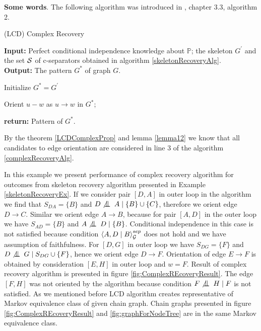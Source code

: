 %
%

\textbf{Some words}. The following algorithm was introduced in \cite{CG}, chapter 3.3, algorithm 2.

\begin{algorithm}
	\caption{(LCD) Complex Recovery}\label{complexRecoveryAlg}
	
	\textbf{Input:} Perfect conditional independence knowledge about $\mathbb{P}$; the skeleton $G^{'}$ and the set 
					$\mathcal{S}$ of c-separators obtained in algorithm \ref{skeletonRecoveryAlg}.  \\
	\textbf{Output:} The pattern $G^{*}$ of graph $G$.

	
	\begin{algorithmic}[1]
			\State Initialize $G^{*} = G^{'}$ 
	
						\State Orient $u - w$ as $u \rightarrow w$ in $G^{*}$;
					\EndIf
				\EndFor
			\EndFor			
			
			\State \textbf{return:} Pattern of $G^{*}$.
		\EndProcedure
	\end{algorithmic}
\end{algorithm}

By the theorem \ref{LCDComplexProp} and lemma \ref{lemma12} we know that all candidates to edge orientation
are considered in line 3 of the algorithm \ref{complexRecoveryAlg}. 


\begin{ex}
	In this example we present performance of complex recovery algorithm for outcomes from skeleton recovery
	algorithm presented in Example \ref{skeletonRecoveryEx}. If we consider pair $[D, A]$ in outer loop in
	the algorithm we find that $S_{DA} = \{ B \}$ and $D \not \bigCI A \mid \{ B \} \cup \{ C \}$, therefore 
	we orient edge $D \rightarrow C$. Similar we orient edge $A \rightarrow B$, because for pair $[A, D]$ in
	the outer loop we have $S_{AD} = \{ B \}$ and $A \not \bigCI D \mid \{ B \} $. Conditional independence 
	in this case is not satisfied because condition $\left\langle A , D \mid B \right\rangle_{\mathcal{G}}^{sep}$ does not hold and we have assumption
	of faithfulness. For $[D, G]$ in outer loop we have $S_{DG} = \{ F\}$ and 
	$D \not \bigCI G \mid S_{DG} \cup \{ F \}$, hence we orient edge $D \rightarrow F$. Orientation of edge 
	$E \rightarrow F$ is obtained by consideration $[E, H]$ in outer loop and $w = F$. Result of complex
	recovery algorithm is presented in figure \ref{fig:ComplexREcoveryResult}. The edge $[F, H]$ was not oriented
	by the algorithm because condition $F \not\bigCI H \mid F$ is not satisfied. As we mentioned before 
	LCD algorithm creates representative of Markov equivalence class of given chain graph. 
	Chain graphs presented in figure \ref{fig:ComplexREcoveryResult} and \ref{fig:graphForNodeTree} are in the
	same Markov equivalence class.  
\end{ex}



